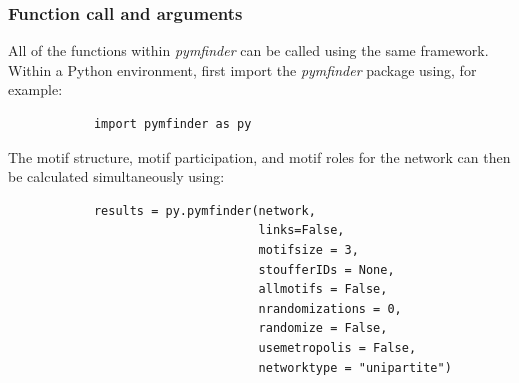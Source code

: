 \documentclass[12pt]{article}
\begin{document}
		\subsubsection{Function call and arguments}
			All of the functions within \emph{pymfinder} can be called using the same framework. Within a Python environment, first import the \emph{pymfinder} package using, for example:

			\begin{lstlisting}
			import pymfinder as py
			\end{lstlisting}
			
			The motif structure, motif participation, and motif roles for the network can then be calculated simultaneously using:

			\begin{lstlisting}
			results = py.pymfinder(network,
			                       links=False,
			                       motifsize = 3,
			                       stoufferIDs = None,
			                       allmotifs = False,
			                       nrandomizations = 0,
			                       randomize = False,
			                       usemetropolis = False,
			                       networktype = "unipartite")
			\end{lstlisting}
\end{document}
